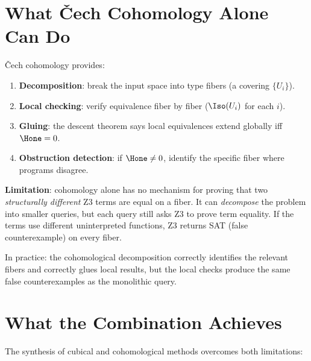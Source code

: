 \section{What \v{C}ech Cohomology Alone Can Do}

\v{C}ech cohomology provides:
\begin{enumerate}
  \item \textbf{Decomposition}: break the input space into type fibers
    (a covering $\{U_i\}$).
  \item \textbf{Local checking}: verify equivalence fiber by fiber
    ($\Iso(U_i)$ for each $i$).
  \item \textbf{Gluing}: the descent theorem says local equivalences
    extend globally iff $\Hone = 0$.
  \item \textbf{Obstruction detection}: if $\Hone \neq 0$, identify
    the specific fiber where programs disagree.
\end{enumerate}

\textbf{Limitation}: cohomology alone has no mechanism for proving
that two \emph{structurally different} Z3 terms are equal on a fiber.
It can \emph{decompose} the problem into smaller queries, but each
query still asks Z3 to prove term equality.  If the terms use different
uninterpreted functions, Z3 returns SAT (false counterexample) on
every fiber.

In practice: the cohomological decomposition correctly identifies the
relevant fibers and correctly glues local results, but the local
checks produce the same false counterexamples as the monolithic query.

\section{What the Combination Achieves}

The synthesis of cubical and cohomological methods overcomes both
limitations:

